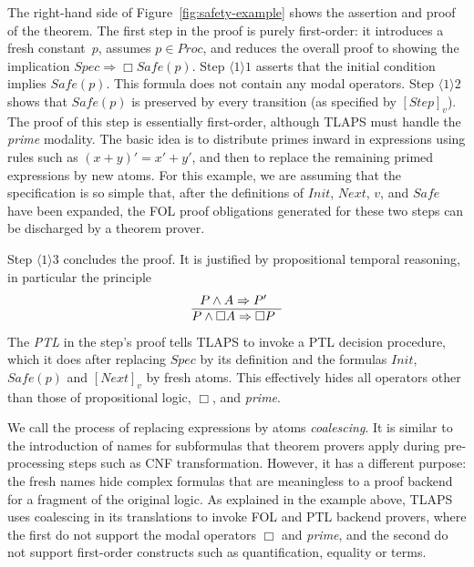 \documentclass{easychair}
\renewcommand{\implies}{\Rightarrow}
\newcommand{\ps}[2]{\ensuremath{\langle #1 \rangle #2}}
\newcommand{\edmargin}[2]{\marginpar{\raggedright\footnotesize\color{red}#1: #2}}
\newcommand{\edmargin}[2]{}
\def\llmargin{\edmargin{LL}}
\def\smmargin{\edmargin{SM}}
\begin{document}
The right-hand side of Figure~\ref{fig:safety-example} shows the
assertion and proof of the theorem.
%
The first step in the proof is purely first-order: it introduces a fresh
constant~$p$, assumes \mbox{$p \in Proc$}, and reduces the overall proof to showing the
implication $Spec \implies \Box Safe(p)$. Step $\ps{1}{1}$ asserts that the
initial condition implies $Safe(p)$. This formula does not contain any modal
operators.
%
%
Step $\ps{1}{2}$ shows that $Safe(p)$ is preserved by every transition
(as specified by $[Step]_v$).
The proof of this step is essentially first-order, although TLAPS must
handle the \emph{prime} modality.  The basic idea is to distribute
primes
inward in expressions using rules such as $(x+y)' = x'+y'$,
and then to replace the remaining primed expressions by new atoms.
For this example, we are
assuming that the specification is so simple that, after the
definitions of $Init$, $Next$, $v$, and $Safe$ have been expanded, the
FOL proof obligations generated for these two steps can be discharged
by a theorem prover.


Step $\ps{1}{3}$ concludes the proof.
It is justified by propositional temporal reasoning, in particular the principle
\[
  \begin{array}{@{}c}
    P \land A \implies P'\\
    \hline
    P \land \Box A \implies \Box P
  \end{array}
 \]
The \emph{PTL} in the step's proof tells TLAPS to invoke a PTL
decision procedure, which it does after replacing $Spec$ by its
definition and the formulas $Init$, $Safe(p)$ and $[Next]_v$ by fresh
atoms.  This effectively hides all operators other than those of
propositional logic, $\Box$, and \emph{prime}.

We call the process of replacing expressions by atoms \emph{coalescing}. It is
similar to the introduction of names for subformulas that theorem provers apply
during pre-processing steps such as CNF transformation. However, it has a
different purpose: the fresh names hide complex formulas that are meaningless to
a proof backend for a fragment of the original logic.
As explained in the example above, TLAPS uses coalescing in its translations to
invoke FOL and PTL backend provers, where the first do not support the modal
operators $\Box$ and \emph{prime}, and the second
do not support first-order constructs such as
quantification, equality or terms.
\end{document}
